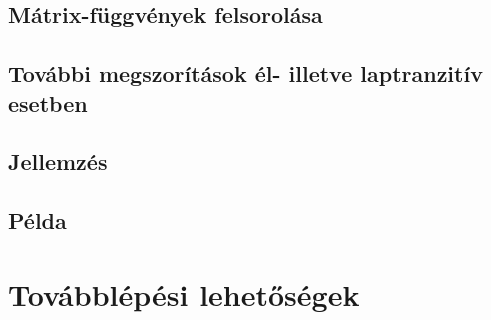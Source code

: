 \documentclass[12pt,magyar,a4paper]{article}
\begin{document}
\subsection{Mátrix-függvények felsorolása}
\subsection{További megszorítások él- illetve laptranzitív esetben}
\subsection{Jellemzés}
\subsection{Példa}

\section{Továbblépési lehetőségek}

\nocite{DHM93,D87,Du88,H93,LM90,Ma67,M94,T82,VS93,F94,F03}


\end{document}
